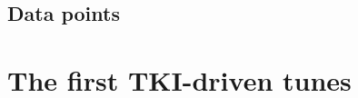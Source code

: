 \subsection{\label{sec:tuning-obs-choice} Data points}




\section{\label{sec:results}The first TKI-driven \genie tunes}


